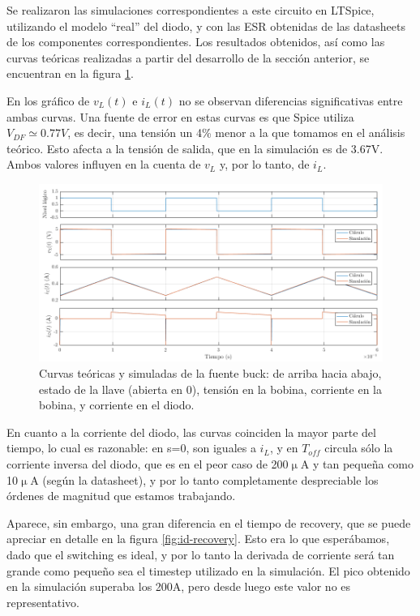 \documentclass[e4_tp1_main.tex]{subfiles}
\begin{document}
Se realizaron las simulaciones correspondientes a este circuito en LTSpice, utilizando el modelo ``real'' del diodo, y con las ESR obtenidas de las datasheets de los componentes correspondientes. Los resultados obtenidos, as\'i como las curvas te\'oricas realizadas a partir del desarrollo de la secci\'on anterior, se encuentran en la figura \ref{fig:buck-curvas}.

En los gr\'afico de $v_L(t)$ e $i_L(t)$ no se observan diferencias significativas entre ambas curvas. Una fuente de error en estas curvas es que Spice utiliza $V_{DF} \simeq 0.77V$, es decir, una tensi\'on un 4\% menor a la que tomamos en el an\'alisis te\'orico. Esto afecta a la tensi\'on de salida, que en la simulaci\'on es de 3.67V. Ambos valores influyen en la cuenta de $v_L$ y, por lo tanto, de $i_L$.


\begin{figure}[ht]
	\centering
	\includegraphics[width=\textwidth]{images/ej2/curvas.png}
	\caption{Curvas te\'oricas y simuladas de la fuente buck: de arriba hacia abajo, estado de la llave (abierta en 0), tensi\'on en la bobina, corriente en la bobina, y corriente en el diodo.}
	\label{fig:buck-curvas}
\end{figure}


En cuanto a la corriente del diodo, las curvas coinciden la mayor parte del tiempo, lo cual es razonable: en s=0, son iguales a $i_L$, y en $T_{off}$  circula s\'olo la corriente inversa del diodo, que es en el peor caso de 200$\upmu$A y tan peque\~na como 10$\upmu$A (seg\'un la datasheet), y por lo tanto completamente despreciable los \'ordenes de magnitud que estamos trabajando.

Aparece, sin embargo, una gran diferencia en el tiempo de recovery, que se puede apreciar en detalle en la figura \ref{fig:id-recovery}. Esto era lo que esper\'abamos, dado que el switching es ideal, y por lo tanto la derivada de corriente ser\'a tan grande como peque\~no sea el timestep utilizado en la simulaci\'on. El pico obtenido en la simulaci\'on superaba los 200A, pero desde luego este valor no es representativo. 
\end{document}
